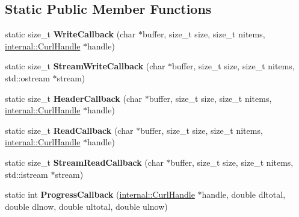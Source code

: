 \subsection*{Static Public Member Functions}
\begin{DoxyCompactItemize}
\item 
\hypertarget{structcurlpp_1_1internal_1_1Callbacks_a5f1b4922a3f68892d25db51bcce627b3}{static size\-\_\-t {\bfseries Write\-Callback} (char $\ast$buffer, size\-\_\-t size, size\-\_\-t nitems, \hyperlink{classcurlpp_1_1internal_1_1CurlHandle}{internal\-::\-Curl\-Handle} $\ast$handle)}\label{structcurlpp_1_1internal_1_1Callbacks_a5f1b4922a3f68892d25db51bcce627b3}

\item 
\hypertarget{structcurlpp_1_1internal_1_1Callbacks_a68277a58922263611d75cb146fd58801}{static size\-\_\-t {\bfseries Stream\-Write\-Callback} (char $\ast$buffer, size\-\_\-t size, size\-\_\-t nitems, std\-::ostream $\ast$stream)}\label{structcurlpp_1_1internal_1_1Callbacks_a68277a58922263611d75cb146fd58801}

\item 
\hypertarget{structcurlpp_1_1internal_1_1Callbacks_a8297769942b956c1d265064ee1327665}{static size\-\_\-t {\bfseries Header\-Callback} (char $\ast$buffer, size\-\_\-t size, size\-\_\-t nitems, \hyperlink{classcurlpp_1_1internal_1_1CurlHandle}{internal\-::\-Curl\-Handle} $\ast$handle)}\label{structcurlpp_1_1internal_1_1Callbacks_a8297769942b956c1d265064ee1327665}

\item 
\hypertarget{structcurlpp_1_1internal_1_1Callbacks_a7eda5772a5a9c54fc1a2c1360bcc941d}{static size\-\_\-t {\bfseries Read\-Callback} (char $\ast$buffer, size\-\_\-t size, size\-\_\-t nitems, \hyperlink{classcurlpp_1_1internal_1_1CurlHandle}{internal\-::\-Curl\-Handle} $\ast$handle)}\label{structcurlpp_1_1internal_1_1Callbacks_a7eda5772a5a9c54fc1a2c1360bcc941d}

\item 
\hypertarget{structcurlpp_1_1internal_1_1Callbacks_a7ab93128d1b912af0fac7a3845768eed}{static size\-\_\-t {\bfseries Stream\-Read\-Callback} (char $\ast$buffer, size\-\_\-t size, size\-\_\-t nitems, std\-::istream $\ast$stream)}\label{structcurlpp_1_1internal_1_1Callbacks_a7ab93128d1b912af0fac7a3845768eed}

\item 
\hypertarget{structcurlpp_1_1internal_1_1Callbacks_aca7773bc439f657959311f11f73b1396}{static int {\bfseries Progress\-Callback} (\hyperlink{classcurlpp_1_1internal_1_1CurlHandle}{internal\-::\-Curl\-Handle} $\ast$handle, double dltotal, double dlnow, double ultotal, double ulnow)}\label{structcurlpp_1_1internal_1_1Callbacks_aca7773bc439f657959311f11f73b1396}


\end{DoxyCompactItemize}
